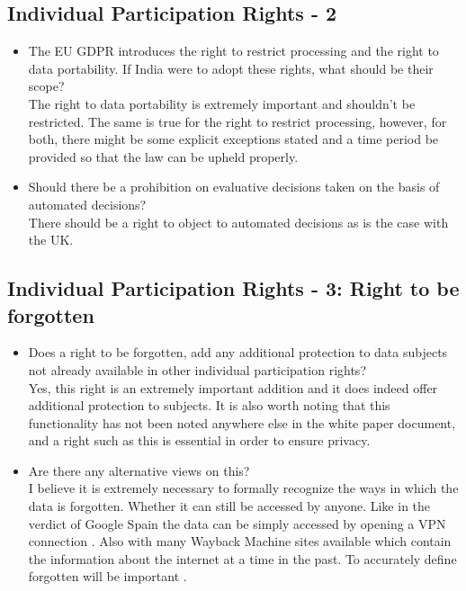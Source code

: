 \subsection{Individual Participation Rights - 2}
\begin{itemize}
	\item The EU GDPR introduces the right to restrict processing and the right to data portability. If India were to adopt these rights, what should be their scope?
	\\
	The right to data portability is extremely important and shouldn't be restricted. The same is true for the right to restrict processing, however, for both, there might be some explicit exceptions stated and a time period be provided so that the law can be upheld properly.
	\item Should there be a prohibition on evaluative decisions taken on the basis of automated decisions?
	\\
	There should be a right to object to automated decisions as is the case with the UK.
\end{itemize}

\subsection{Individual Participation Rights - 3: Right to be forgotten}
\begin{itemize}
	\item Does a right to be forgotten, add any additional protection to data subjects not already available in other individual participation rights?
	\\
	Yes, this right is an extremely important addition and it does indeed offer additional protection to subjects. It is also worth noting that this functionality has not been noted anywhere else in the white paper document, and a right such as this is essential in order to ensure privacy.
	\item Are there any alternative views on this?
	\\
	I believe it is extremely necessary to formally recognize the ways in which the data is forgotten. Whether it can still be accessed by anyone. Like in the verdict of Google Spain the data can be simply accessed by opening a VPN connection \cite{googlespain}. Also with many Wayback Machine sites available which contain the information about the internet at a time in the past. To accurately define forgotten will be important \cite{wayback}.
\end{itemize}
